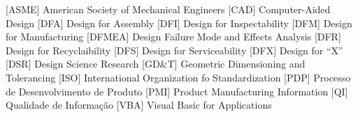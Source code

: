 \begin{acronym}[ASME]
[ASME] {American Society of Mechanical Engineers}
[CAD] {Computer-Aided Design}
[DFA] {Design for Assembly}
[DFI] {Design for Inspectability}
[DFM] {Design for Manufacturing}
[DFMEA] {Design Failure Mode and Effects Analysis}
[DFR] {Design for Recyclaibility}
[DFS] {Design for Serviceability}
[DFX] {Design for “X”}
[DSR] {Design Science Research}
[GD$\&$T] {Geometric Dimensioning and Tolerancing}
[ISO] {International Organization fo Standardization}
[PDP] {Processo de Desenvolvimento de Produto}
[PMI] {Product Manufacturing Information}
[QI] {Qualidade de Informação}
[VBA] {Visual Basic for Applications}


\end{acronym}